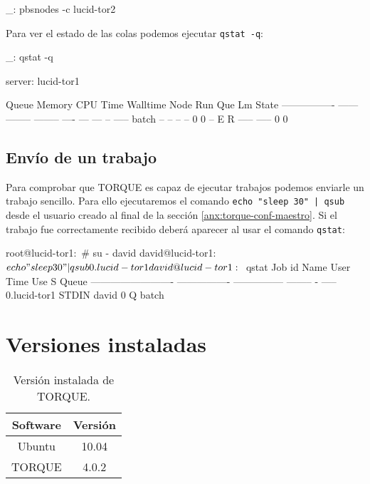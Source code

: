 \begin{bashcode}
_: pbsnodes -c lucid-tor2
\end{bashcode}

Para ver el estado de las colas podemos ejecutar \texttt{qstat -q}:

\begin{bashcode}
_: qstat -q

server: lucid-tor1

Queue            Memory CPU Time Walltime Node  Run Que Lm  State
---------------- ------ -------- -------- ----  --- --- --  -----
batch              --      --       --      --    0   0 --   E R
                                               ----- -----
                                                   0     0
\end{bashcode}


\subsection{Envío de un trabajo}

Para comprobar que TORQUE es capaz de ejecutar trabajos podemos enviarle un trabajo sencillo. Para ello ejecutaremos el comando \texttt{echo "sleep 30" | qsub} desde el usuario creado al final de la sección \ref{anx:torque-conf-maestro}. Si el trabajo fue correctamente recibido deberá aparecer al usar el comando \texttt{qstat}:

\begin{bashcode}
root@lucid-tor1:~# su - david
david@lucid-tor1:~$ echo "sleep 30" | qsub
0.lucid-tor1
david@lucid-tor1:~$ qstat
Job id                    Name             User            Time Use S Queue
------------------------- ---------------- --------------- -------- - -----
0.lucid-tor1              STDIN            david                  0 Q batch
\end{bashcode}


\section{Versiones instaladas}

\begin{table}[!htbp]
\centering
   \begin{tabular}{|c|c|}
      \hline
      \textbf{Software} & \textbf{Versión} \\ \hline
      Ubuntu & 10.04 \\ \hline
      TORQUE & 4.0.2 \\ \hline
   \end{tabular}
\caption{Versión instalada de TORQUE.}
\label{table:torque-versions}
\end{table}
